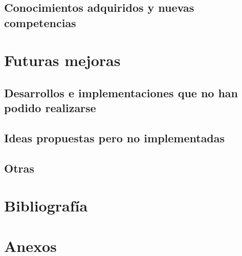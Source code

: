 \section{Conocimientos adquiridos y nuevas competencias}


\chapter{Futuras mejoras}

\section{Desarrollos e implementaciones que no han podido realizarse}

\section{Ideas propuestas pero no implementadas}

\section{Otras}


\chapter*{Bibliografía}


\chapter*{Anexos}
